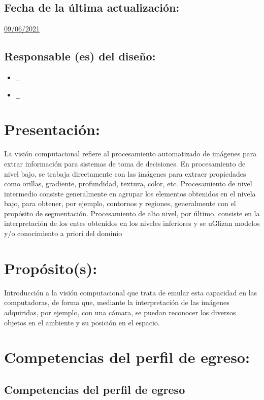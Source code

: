 \documentclass[10 pt]{article}
\begin{document}
\subsection{Fecha de la \'{u}ltima actualizaci\'{o}n:} \underline{09/06/2021}
\subsection{Responsable (es) del dise\~{n}o:}
\begin{itemize}[label={}]
\item \underline{\narturo~\arturo}
\item \underline{\nelisa~\elisa}
\end{itemize}
\newpage
\section{Presentaci\'{o}n:}

La visi\'{o}n computacional refiere al procesamiento automatizado de
im\'{a}genes para extrar informaci\'{o}n para sistemas de toma de decisiones.
En procesamiento de nivel bajo, se trabaja directamente con las
im\'{a}genes para extraer propiedades como orillas, gradiente,
profundidad, textura, color, etc. Procesamiento de nivel intermedio
consiste generalmente en agrupar los elementos obtenidos en el nivela
bajo, para obtener, por ejemplo, contornos y regiones, generalmente
con el prop\'{o}sito de segmentaci\'{o}n. Procesamiento de alto nivel, por
\'{u}ltimo, consiste en la interpretaci\'{o}n de los entes obtenidos en los
niveles inferiores y se uGlizan modelos y/o conocimiento a priori del
dominio

\section{Prop\'{o}sito(s):}

Introducci\'{o}n a la visi\'{o}n computacional que trata de emular esta
capacidad en las computadoras, de forma que, mediante la
interpretaci\'{o}n de las im\'{a}genes adquiridas, por ejemplo, con una
c\'{a}mara, se puedan reconocer los diversos objetos en el ambiente y su
posici\'{o}n en el espacio.

\section{Competencias del perfil de egreso:}
\subsection{Competencias del perfil de egreso}
\end{document}
